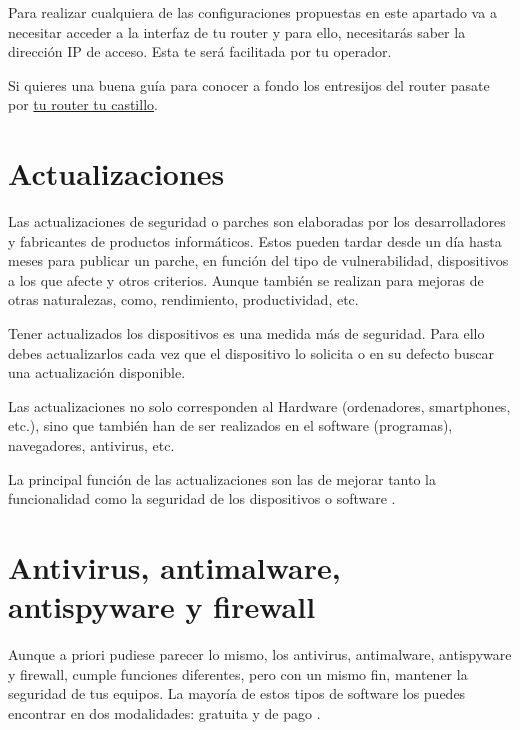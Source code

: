 \documentclass[
  a4paper,
  openany]{book}
\begin{document}
Para realizar cualquiera de las configuraciones propuestas en este apartado va a necesitar acceder a la interfaz de tu router y para ello, necesitarás saber la dirección IP de acceso. Esta te será facilitada por tu operador.

Si quieres una buena guía para conocer a fondo los entresijos del router pasate por \href{https://www.osi.es/sites/default/files/docs/guia_router/osi-guia-tu-router-tu-castillo.pdf}{tu router tu castillo}.

\hypertarget{actualizaciones}{%
\section{Actualizaciones}\label{actualizaciones}}

Las actualizaciones de seguridad o parches son elaboradas por los desarrolladores y fabricantes de productos informáticos. Estos pueden tardar desde un día hasta meses para publicar un parche, en función del tipo de vulnerabilidad, dispositivos a los que afecte y otros criterios. Aunque también se realizan para mejoras de otras naturalezas, como, rendimiento, productividad, etc.

Tener actualizados los dispositivos es una medida más de seguridad. Para ello debes actualizarlos cada vez que el dispositivo lo solicita o en su defecto buscar una actualización disponible.

Las actualizaciones no solo corresponden al Hardware (ordenadores, smartphones, etc.), sino que también han de ser realizados en el software (programas), navegadores, antivirus, etc.

La principal función de las actualizaciones son las de mejorar tanto la funcionalidad como la seguridad de los dispositivos o software \citep{OSI-actualizaciones}.

\hypertarget{antivirus-antimalware-antispyware-y-firewall}{%
\section{Antivirus, antimalware, antispyware y firewall}\label{antivirus-antimalware-antispyware-y-firewall}}

Aunque a priori pudiese parecer lo mismo, los antivirus, antimalware, antispyware y firewall, cumple funciones diferentes, pero con un mismo fin, mantener la seguridad de tus equipos. La mayoría de estos tipos de software los puedes encontrar en dos modalidades: gratuita y de pago \citep{software-seguridad}.
\end{document}
